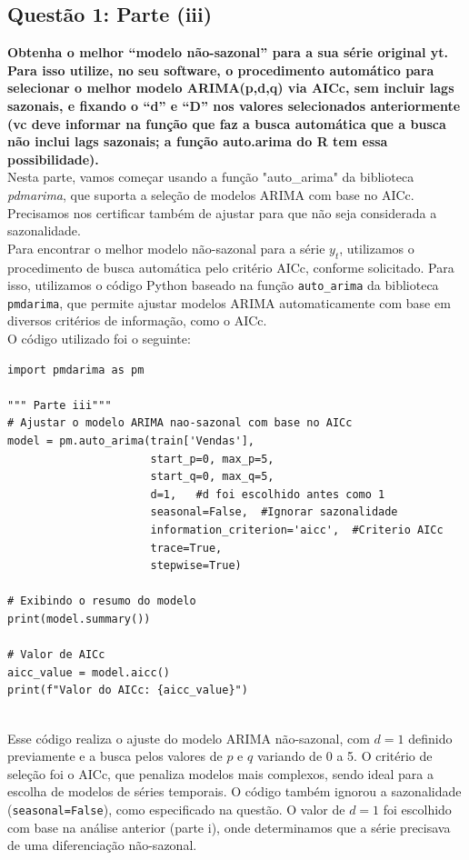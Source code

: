 \documentclass[a4paper, 12pt]{article}
\begin{document}
\subsection{Questão 1: Parte (iii)}
\textbf{Obtenha o melhor “modelo não-sazonal” para a sua série original yt. Para isso utilize, no seu
software, o procedimento automático para selecionar o melhor modelo ARIMA(p,d,q) via AICc,
sem incluir lags sazonais, e fixando o “d” e “D” nos valores selecionados anteriormente (vc
deve informar na função que faz a busca automática que a busca não inclui lags sazonais; a
função auto.arima do R tem essa possibilidade).}\\

Nesta parte, vamos começar usando a função "auto\_arima" da biblioteca \textit{pdmarima}, que suporta a seleção de modelos ARIMA com base no AICc. Precisamos nos certificar também de ajustar para que não seja considerada a sazonalidade.\\

Para encontrar o melhor modelo não-sazonal para a série \(y_t\), utilizamos o procedimento de busca automática pelo critério AICc, conforme solicitado. Para isso, utilizamos o código Python baseado na função \texttt{auto\_arima} da biblioteca \texttt{pmdarima}, que permite ajustar modelos ARIMA automaticamente com base em diversos critérios de informação, como o AICc.\\

O código utilizado foi o seguinte:

\begin{lstlisting}[style=python]
import pmdarima as pm

""" Parte iii"""
# Ajustar o modelo ARIMA nao-sazonal com base no AICc
model = pm.auto_arima(train['Vendas'],
                      start_p=0, max_p=5,
                      start_q=0, max_q=5,
                      d=1,   #d foi escolhido antes como 1
                      seasonal=False,  #Ignorar sazonalidade
                      information_criterion='aicc',  #Criterio AICc
                      trace=True,
                      stepwise=True)

# Exibindo o resumo do modelo
print(model.summary())

# Valor de AICc
aicc_value = model.aicc()
print(f"Valor do AICc: {aicc_value}")
    \end{lstlisting} \\

Esse código realiza o ajuste do modelo ARIMA não-sazonal, com \(d = 1\) definido previamente e a busca pelos valores de \(p\) e \(q\) variando de 0 a 5. O critério de seleção foi o AICc, que penaliza modelos mais complexos, sendo ideal para a escolha de modelos de séries temporais. O código também ignorou a sazonalidade (\texttt{seasonal=False}), como especificado na questão. O valor de \(d = 1\) foi escolhido com base na análise anterior (parte i), onde determinamos que a série precisava de uma diferenciação não-sazonal.
\end{document}
